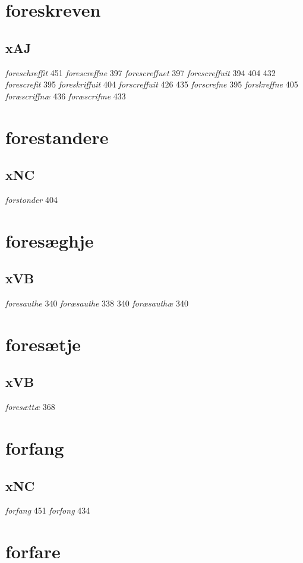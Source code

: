 \documentclass[a4paper,twocolumn]{article}
\begin{document}
\section{foreskreven}
\label{sec:orgc3394fb}
\subsection{xAJ}
\label{sec:org9249a8d}
\emph{foreschreffit} 451 \emph{forescreffne} 397 \emph{forescreffuet} 397 \emph{forescreffuit} 394 404 432 \emph{forescrefit} 395 \emph{foreskriffuit} 404 \emph{forscreffuit} 426 435 \emph{forscrefne} 395 \emph{forskreffne} 405 \emph{foræscriffnæ} 436 \emph{foræscrifme} 433 
\section{forestandere}
\label{sec:org4d9bc63}
\subsection{xNC}
\label{sec:org712f313}
\emph{forstonder} 404 
\section{foresæghje}
\label{sec:org04a0836}
\subsection{xVB}
\label{sec:org0550b8c}
\emph{foresauthe} 340 \emph{foræsauthe} 338 340 \emph{foræsauthæ} 340 
\section{foresætje}
\label{sec:org405f563}
\subsection{xVB}
\label{sec:org5d0aeaa}
\emph{foresættæ} 368 
\section{forfang}
\label{sec:orga46fcbb}
\subsection{xNC}
\label{sec:org782859b}
\emph{forfang} 451 \emph{forfong} 434 
\section{forfare}
\label{sec:org78733fb}
\end{document}
